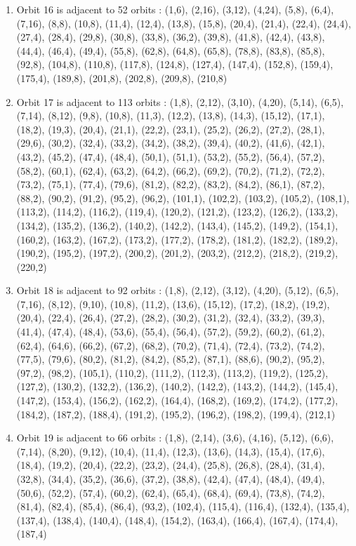 \documentclass[12pt]{article}
\begin{document}
\begin{enumerate}
\item Orbit 16 is adjacent to 52 orbits : (1,6), (2,16), (3,12), (4,24), (5,8), (6,4), (7,16), (8,8), (10,8), (11,4), (12,4), (13,8), (15,8), (20,4), (21,4), (22,4), (24,4), (27,4), (28,4), (29,8), (30,8), (33,8), (36,2), (39,8), (41,8), (42,4), (43,8), (44,4), (46,4), (49,4), (55,8), (62,8), (64,8), (65,8), (78,8), (83,8), (85,8), (92,8), (104,8), (110,8), (117,8), (124,8), (127,4), (147,4), (152,8), (159,4), (175,4), (189,8), (201,8), (202,8), (209,8), (210,8)
\item Orbit 17 is adjacent to 113 orbits : (1,8), (2,12), (3,10), (4,20), (5,14), (6,5), (7,14), (8,12), (9,8), (10,8), (11,3), (12,2), (13,8), (14,3), (15,12), (17,1), (18,2), (19,3), (20,4), (21,1), (22,2), (23,1), (25,2), (26,2), (27,2), (28,1), (29,6), (30,2), (32,4), (33,2), (34,2), (38,2), (39,4), (40,2), (41,6), (42,1), (43,2), (45,2), (47,4), (48,4), (50,1), (51,1), (53,2), (55,2), (56,4), (57,2), (58,2), (60,1), (62,4), (63,2), (64,2), (66,2), (69,2), (70,2), (71,2), (72,2), (73,2), (75,1), (77,4), (79,6), (81,2), (82,2), (83,2), (84,2), (86,1), (87,2), (88,2), (90,2), (91,2), (95,2), (96,2), (101,1), (102,2), (103,2), (105,2), (108,1), (113,2), (114,2), (116,2), (119,4), (120,2), (121,2), (123,2), (126,2), (133,2), (134,2), (135,2), (136,2), (140,2), (142,2), (143,4), (145,2), (149,2), (154,1), (160,2), (163,2), (167,2), (173,2), (177,2), (178,2), (181,2), (182,2), (189,2), (190,2), (195,2), (197,2), (200,2), (201,2), (203,2), (212,2), (218,2), (219,2), (220,2)
\item Orbit 18 is adjacent to 92 orbits : (1,8), (2,12), (3,12), (4,20), (5,12), (6,5), (7,16), (8,12), (9,10), (10,8), (11,2), (13,6), (15,12), (17,2), (18,2), (19,2), (20,4), (22,4), (26,4), (27,2), (28,2), (30,2), (31,2), (32,4), (33,2), (39,3), (41,4), (47,4), (48,4), (53,6), (55,4), (56,4), (57,2), (59,2), (60,2), (61,2), (62,4), (64,6), (66,2), (67,2), (68,2), (70,2), (71,4), (72,4), (73,2), (74,2), (77,5), (79,6), (80,2), (81,2), (84,2), (85,2), (87,1), (88,6), (90,2), (95,2), (97,2), (98,2), (105,1), (110,2), (111,2), (112,3), (113,2), (119,2), (125,2), (127,2), (130,2), (132,2), (136,2), (140,2), (142,2), (143,2), (144,2), (145,4), (147,2), (153,4), (156,2), (162,2), (164,4), (168,2), (169,2), (174,2), (177,2), (184,2), (187,2), (188,4), (191,2), (195,2), (196,2), (198,2), (199,4), (212,1)
\item Orbit 19 is adjacent to 66 orbits : (1,8), (2,14), (3,6), (4,16), (5,12), (6,6), (7,14), (8,20), (9,12), (10,4), (11,4), (12,3), (13,6), (14,3), (15,4), (17,6), (18,4), (19,2), (20,4), (22,2), (23,2), (24,4), (25,8), (26,8), (28,4), (31,4), (32,8), (34,4), (35,2), (36,6), (37,2), (38,8), (42,4), (47,4), (48,4), (49,4), (50,6), (52,2), (57,4), (60,2), (62,4), (65,4), (68,4), (69,4), (73,8), (74,2), (81,4), (82,4), (85,4), (86,4), (93,2), (102,4), (115,4), (116,4), (132,4), (135,4), (137,4), (138,4), (140,4), (148,4), (154,2), (163,4), (166,4), (167,4), (174,4), (187,4)

\end{enumerate}
\end{document}
